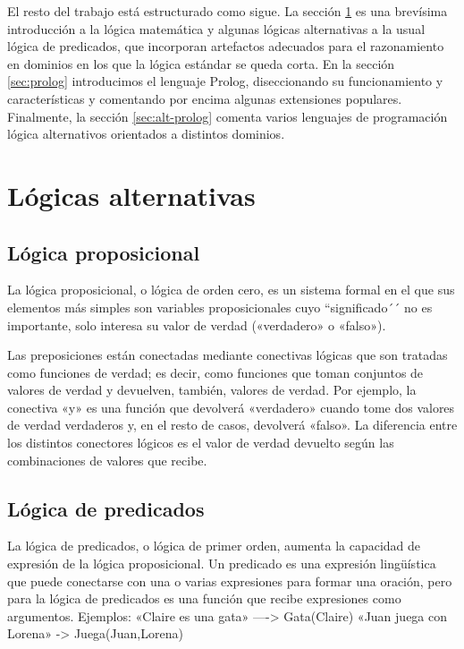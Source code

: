\documentclass[11pt,captions=nooneline,DIV=14, parskip=full]{scrartcl}
\begin{document}
El resto del trabajo está estructurado como sigue. La sección \ref{sec:alt-logic} es una brevísima introducción a la lógica matemática y algunas lógicas alternativas a la usual lógica de predicados, que incorporan artefactos adecuados para el razonamiento en dominios en los que la lógica estándar se queda corta. En la sección \ref{sec:prolog} introducimos el lenguaje Prolog, diseccionando su funcionamiento y características y comentando por encima algunas extensiones populares. Finalmente, la sección \ref{sec:alt-prolog} comenta varios lenguajes de programación lógica alternativos orientados a distintos dominios.

\section{Lógicas alternativas}
\label{sec:alt-logic}
\subsection{Lógica proposicional}

	La lógica proposicional, o lógica de orden cero, es un sistema formal en el que sus elementos más simples son variables proposicionales cuyo ``significado´´ no es importante, solo interesa su valor de verdad («verdadero» o «falso»).

	Las preposiciones están conectadas mediante conectivas lógicas que son tratadas como funciones de verdad; es decir, como funciones que toman conjuntos de valores de verdad y devuelven, también, valores de verdad. Por ejemplo, la conectiva «y» es una función que devolverá «verdadero» cuando tome dos valores de verdad verdaderos y, en el resto de casos, devolverá «falso». La diferencia entre los distintos conectores lógicos es el valor de verdad devuelto según las combinaciones de valores que recibe.

\subsection{Lógica de predicados}

	La lógica de predicados, o lógica de primer orden, aumenta la capacidad de expresión de la lógica proposicional. Un predicado es una expresión lingüística que puede conectarse con una o varias expresiones para formar una oración, pero para la lógica de predicados es una función que recibe expresiones como argumentos. Ejemplos:
«Claire es una gata» ----> Gata(Claire)
«Juan juega con Lorena» -> Juega(Juan,Lorena)
\end{document}

